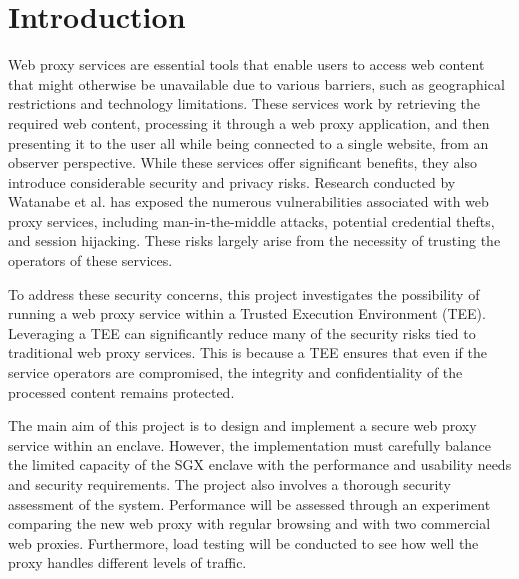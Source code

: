 \chapter{Introduction}\label{ch:sample-chapter}

Web proxy services are essential tools that enable users to access web content that might otherwise be unavailable due to various barriers, such as geographical restrictions and technology limitations. These services work by retrieving the required web content, processing it through a web proxy application, and then presenting it to the user all while being connected to a single website, from an observer perspective. While these services offer significant benefits, they also introduce considerable security and privacy risks. Research conducted by Watanabe et al. \cite{watanabe2020melting}  has exposed the numerous vulnerabilities associated with web proxy services, including man-in-the-middle attacks, potential credential thefts, and session hijacking. These risks largely arise from the necessity of trusting the operators of these services.

To address these security concerns, this project investigates the possibility of running a web proxy service within a Trusted Execution Environment (TEE). Leveraging a TEE can significantly reduce many of the security risks tied to traditional web proxy services. This is because a TEE ensures that even if the service operators are compromised, the integrity and confidentiality of the processed content remains protected.

The main aim of this project is to design and implement a secure web proxy service within an enclave. However, the implementation must carefully balance the limited capacity of the SGX enclave with the performance and usability needs and security requirements. The project also involves a thorough security assessment of the system. Performance will be assessed through an experiment comparing the new web proxy with regular browsing and with two commercial web proxies. Furthermore, load testing will be conducted to see how well the proxy handles different levels of traffic.

